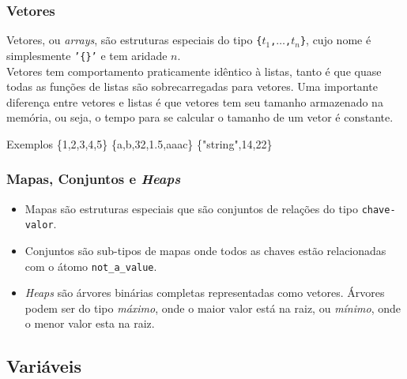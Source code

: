 
\begin{frame}
	\frametitle{Vetores}
	
	Vetores, ou \textit{arrays}, são estruturas especiais do tipo \texttt{\{$t_1$,$\ldots$,$t_{n}$\}},
	cujo nome é simplesmente \texttt{'\{\}'} e tem aridade $n$.\\
	Vetores tem comportamento praticamente idêntico à listas, tanto é que quase todas as funções de listas
	são sobrecarregadas para vetores. Uma importante diferença entre vetores e listas é que vetores tem seu 
	tamanho armazenado na memória, ou seja, o tempo para se calcular o tamanho de um vetor é constante.
	
	\begin{exampleblock}{Exemplos}
		\{1,2,3,4,5\} \: \{a,b,32,1.5,aaac\} \: \{"string",14,22\}
	\end{exampleblock}
	
\end{frame}


\begin{frame}
	\frametitle{Mapas, Conjuntos e \textit{Heaps}}
	
	\begin{itemize}
		\item Mapas são estruturas especiais que são conjuntos de relações do tipo \texttt{chave-valor}.
		
		\item Conjuntos são sub-tipos de mapas onde todos as chaves estão relacionadas com o átomo 
		\texttt{not\_a\_value}.
		
		\item \textit{Heaps} são árvores binárias completas representadas como vetores.
		Árvores podem ser do tipo \textit{máximo}, onde o maior valor está na raiz, ou \textit{mínimo}, 
		onde o menor valor esta na raiz.
	\end{itemize}
	
\end{frame}


\subsection{Variáveis}

